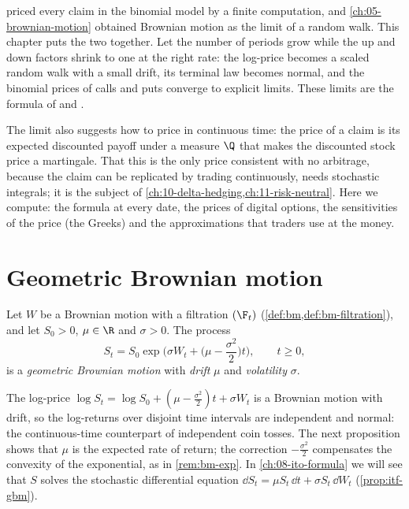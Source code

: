 
 priced every claim in the binomial model by a finite computation,
and \cref{ch:05-brownian-motion} obtained Brownian motion as the limit of a random walk.
This chapter puts the two together. Let the number of periods grow while the up and down
factors shrink to one at the right rate: the log-price becomes a scaled random walk with a
small drift, its terminal law becomes normal, and the binomial prices of calls and puts
converge to explicit limits. These limits are the formula of \textcite{black-scholes} and
\textcite{merton1973}.

The limit also suggests how to price in continuous time: the price of a claim is its
expected discounted payoff under a measure $\Q$ that makes the discounted stock price a
martingale. That this is the only price consistent with no arbitrage, because the claim
can be replicated by trading continuously, needs stochastic integrals; it is the subject of
\cref{ch:10-delta-hedging,ch:11-risk-neutral}. Here we compute: the formula at every
date, the prices of digital options, the sensitivities of the price (the Greeks) and the
approximations that traders use at the money.

\section{Geometric Brownian motion}\label{sec:bs-gbm}

\begin{definition}\label{def:bs-gbm}
Let $W$ be a Brownian motion with a filtration $(\F_t)$ (\cref{def:bm,def:bm-filtration}),
and let $S_0>0$, $\mu\in\R$ and $\sigma>0$. The process
\[
  S_t=S_0\exp\Big(\sigma W_t+\Big(\mu-\frac{\sigma^2}{2}\Big)t\Big),\qquad t\ge0,
\]
is a \emph{geometric Brownian motion} with \emph{drift} $\mu$ and \emph{volatility}
$\sigma$.
\end{definition}

The log-price $\log S_t=\log S_0+(\mu-\frac{\sigma^2}2)t+\sigma W_t$ is a Brownian motion
with drift, so the log-returns over disjoint time intervals are independent and normal:
the continuous-time counterpart of independent coin tosses. The next proposition shows
that $\mu$ is the expected rate of return; the correction $-\frac{\sigma^2}{2}$ compensates
the convexity of the exponential, as in \cref{rem:bm-exp}. In \cref{ch:08-ito-formula} we
will see that $S$ solves the stochastic differential equation
$\dd S_t=\mu S_t\,\dd t+\sigma S_t\,\dd W_t$ (\cref{prop:itf-gbm}).

